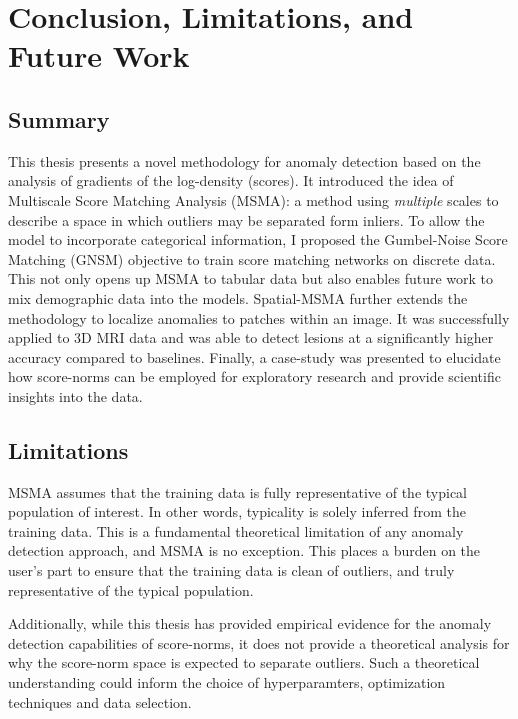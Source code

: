 \chapter{Conclusion, Limitations, and Future Work}
\label{ch:conclusion}

\section{Summary}
This thesis presents a novel methodology for anomaly detection based on the analysis of gradients of the log-density (scores). It introduced the idea of Multiscale Score Matching Analysis (MSMA): a method using \textit{multiple} scales to describe a space in which outliers may be separated form inliers.
To allow the model to incorporate categorical information, I proposed the Gumbel-Noise Score Matching (GNSM) objective to train score matching networks on discrete data. This not only opens up MSMA to tabular data but also enables future work to mix demographic data into the models.
Spatial-MSMA further extends the methodology to localize anomalies to patches within an image. It was successfully applied to 3D MRI data and was able to detect lesions at a significantly higher accuracy compared to baselines.
Finally, a case-study was presented to elucidate how score-norms can be employed for exploratory research and provide scientific insights into the data.

\section{Limitations}
MSMA assumes that the training data is fully representative of the typical population of interest. In other words, typicality is solely inferred from the training data. This is a fundamental theoretical limitation of any anomaly detection approach, and MSMA is no exception. This places a burden on the user's part to ensure that the training data is clean of outliers, and truly representative of the typical population.


Additionally, while this thesis has provided empirical evidence for the anomaly detection capabilities of score-norms, it does not provide a theoretical analysis for why the score-norm space is expected to separate outliers. Such a theoretical understanding could inform the choice of hyperparamters, optimization techniques and data selection.

